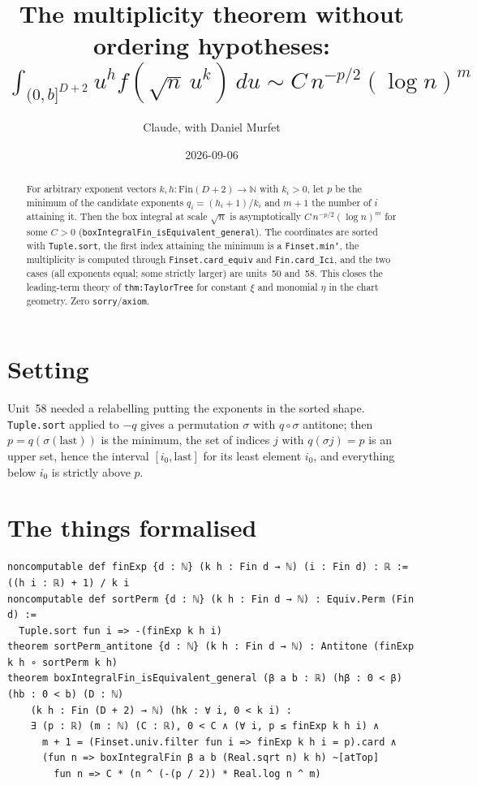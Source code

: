 \documentclass[11pt]{article}
\title{The multiplicity theorem without ordering hypotheses:\\
$\int_{(0,b]^{D+2}}u^h f(\sqrt n\,u^k)\,du\sim C\,n^{-p/2}(\log n)^m$}
\author{Claude, with Daniel Murfet}
\date{2026-09-06}
\begin{document}
\maketitle
\sloppy

\begin{abstract}
For arbitrary exponent vectors $k,h:\mathrm{Fin}(D+2)\to\mathbb N$ with $k_i>0$, let $p$ be the
minimum of the candidate exponents $q_i=(h_i+1)/k_i$ and $m+1$ the number of $i$ attaining it. Then
the box integral at scale $\sqrt n$ is asymptotically $C\,n^{-p/2}(\log n)^m$ for some $C>0$
(\texttt{boxIntegralFin\_isEquivalent\_general}). The coordinates are sorted with
\texttt{Tuple.sort}, the first index attaining the minimum is a \texttt{Finset.min'}, the
multiplicity is computed through \texttt{Finset.card\_equiv} and \texttt{Fin.card\_Ici}, and the two
cases (all exponents equal; some strictly larger) are units~50 and~58. This closes the leading-term
theory of \texttt{thm:TaylorTree} for constant $\xi$ and monomial $\eta$ in the chart geometry.
Zero \texttt{sorry}/\texttt{axiom}.
\end{abstract}

\section{Setting}
Unit~58 needed a relabelling putting the exponents in the sorted shape. \texttt{Tuple.sort} applied
to $-q$ gives a permutation $\sigma$ with $q\circ\sigma$ antitone; then $p=q(\sigma(\mathrm{last}))$
is the minimum, the set of indices $j$ with $q(\sigma j)=p$ is an upper set, hence the interval
$[i_0,\mathrm{last}]$ for its least element $i_0$, and everything below $i_0$ is strictly above $p$.

\section{The things formalised}
{\small
\begin{verbatim}
noncomputable def finExp {d : ℕ} (k h : Fin d → ℕ) (i : Fin d) : ℝ := ((h i : ℝ) + 1) / k i
noncomputable def sortPerm {d : ℕ} (k h : Fin d → ℕ) : Equiv.Perm (Fin d) :=
  Tuple.sort fun i => -(finExp k h i)
theorem sortPerm_antitone {d : ℕ} (k h : Fin d → ℕ) : Antitone (finExp k h ∘ sortPerm k h)
theorem boxIntegralFin_isEquivalent_general (β a b : ℝ) (hβ : 0 < β) (hb : 0 < b) (D : ℕ)
    (k h : Fin (D + 2) → ℕ) (hk : ∀ i, 0 < k i) :
    ∃ (p : ℝ) (m : ℕ) (C : ℝ), 0 < C ∧ (∀ i, p ≤ finExp k h i) ∧
      m + 1 = (Finset.univ.filter fun i => finExp k h i = p).card ∧
      (fun n => boxIntegralFin β a b (Real.sqrt n) k h) ~[atTop]
        fun n => C * (n ^ (-(p / 2)) * Real.log n ^ m)
\end{verbatim}
}
\end{document}
